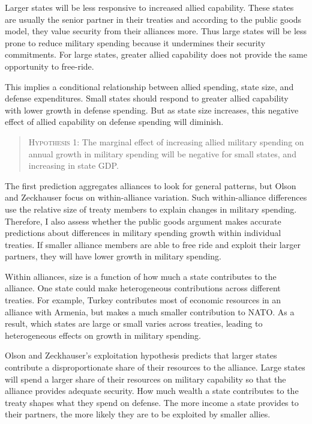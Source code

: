 \documentclass[12pt]{article}
\begin{document}
 
Larger states will be less responsive to increased allied capability. 
These states are usually the senior partner in their treaties and according to the public goods model, they value security from their alliances more. 
Thus large states will be less prone to reduce military spending because it undermines their security commitments. 
For large states, greater allied capability does not provide the same opportunity to free-ride.


This implies a conditional relationship between allied spending, state size, and defense expenditures. 
Small states should respond to greater allied capability with lower growth in defense spending. 
But as state size increases, this negative effect of allied capability on defense spending will diminish. 


\begin{quote}
\textsc{Hypothesis 1}: The marginal effect of increasing allied military spending on annual growth in military spending will be negative for small states, and increasing in state GDP. 
\end{quote}


The first prediction aggregates alliances to look for general patterns, but Olson and Zeckhauser focus on within-alliance variation.
Such within-alliance differences use the relative size of treaty members to explain changes in military spending. 
Therefore, I also assess whether the public goods argument makes accurate predictions about differences in military spending growth within individual treaties. 
If smaller alliance members are able to free ride and exploit their larger partners, they will have lower growth in military spending.  

 
Within alliances, size is a function of how much a state contributes to the alliance.
One state could make heterogeneous contributions across different treaties. 
For example, Turkey contributes most of economic resources in an alliance with Armenia, but makes a much smaller contribution to NATO. 
As a result, which states are large or small varies across treaties, leading to heterogeneous effects on growth in military spending. 


Olson and Zeckhauser's exploitation hypothesis predicts that larger states contribute a disproportionate share of their resources to the alliance. 
Large states will spend a larger share of their resources on military capability so that the alliance provides adequate security. 
How much wealth a state contributes to the treaty shapes what they spend on defense. 
The more income a state provides to their partners, the more likely they are to be exploited by smaller allies. 
\end{document}
